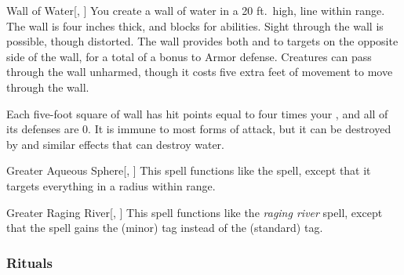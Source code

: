 \lowercase{\hypertarget{spell:Wall of Water}{}}\label{spell:Wall of Water}
\begin{apability}[\nth{3}]{\hypertarget{spell:Wall of Water}{Wall of Water}}[, ]
You create a wall of water in a 20 ft.\ high, \arealarge line within \rngmed range.
The wall is four inches thick, and blocks  for abilities.
Sight through the wall is possible, though distorted.
The wall provides both  and  to targets on the opposite side of the wall, for a total of a  bonus to Armor defense.
Creatures can pass through the wall unharmed, though it costs five extra feet of movement to move through the wall.

Each five-foot square of wall has hit points equal to four times your , and all of its defenses are 0.
It is immune to most forms of attack, but it can be destroyed by  and similar effects that can destroy water.
\end{apability}
\vspace{0.25em}



\lowercase{\hypertarget{spell:Greater Aqueous Sphere}{}}\label{spell:Greater Aqueous Sphere}
\begin{apability}[\nth{4}]{\hypertarget{spell:Greater Aqueous Sphere}{Greater Aqueous Sphere}}[, ]
This spell functions like the  spell, except that it targets everything in a \areamed radius within \rnglong range.
\end{apability}
\vspace{0.25em}



\lowercase{\hypertarget{spell:Greater Raging River}{}}\label{spell:Greater Raging River}
\begin{apability}[\nth{5}]{\hypertarget{spell:Greater Raging River}{Greater Raging River}}[, ]
This spell functions like the \textit{raging river} spell, except that the spell gains the  (minor) tag instead of the  (standard) tag.
\end{apability}
\vspace{0.25em}



\subsubsection{Rituals}


